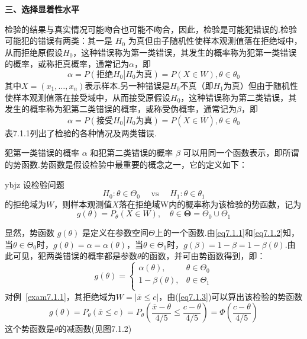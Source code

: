 \textbf{三、选择显着性水平}

检验的结果与真实情况可能吻合也可能不吻合，因此，检验是可能犯错误的.检验可能犯的错误有两类：其一是 $H_{0}$ 为真但由子随机性使样本观测值落在拒绝域中，从而拒绝原假设$H_{0}$，这种错误称为第一类错误，其发生的概率称为犯第一类错误的概率，或称拒真概率，通常记为$\alpha$，即
\begin{equation}\label{eq7.1.1}
\alpha =P\left(\textrm{拒绝}H_0\left| H_0\textrm{为真}\right.\right)=P\left(X\in W\right),\theta\in\theta_0
\end{equation}
其中$X= \left( x _ { 1 } , \dotsc , x _ { n } \right)$表示样本.另一种错误是$H_{0}$不真（即$H_{1}$为真）但由于随机性使样本观测值落在接受域中，从而接受原假设$H_{0}$，这种错误称为第二类错误，其发生的概率称为犯第二类错误的概率，或称受伪概率，通常记为$\beta$，即
\begin{equation}\label{eq7.1.2}
\alpha =P\left(\textrm{接受}H_0\left| H_0\textrm{为真}\right.\right)=P\left(X\in \overline{ W }\right),\theta\in\theta_0
\end{equation}
表7.1.1列出了检验的各种情况及两类错误.

犯第一类错误的概率 $\alpha$ 和犯第二类错误的概率 $\beta$ 可以用同一个函数表示，即所谓的势函数.势函数是假设检验中最重要的概念之一，它的定义如下：
\begin{definition}{}{ybjz}
	设检验问题
	\[H _ { 0 } : \theta \in \Theta _ { 0 } \quad \text { vs } \quad H _ { 1 } : \theta \in \theta  _ { 1 }\]
	的拒绝域为$W$，则样本观测值$X$落在拒绝域W内的概率称为该检验的势函数，记为
	\begin{equation}\label{eq7.1.3}
	g\left(\theta\right)=P_{\theta}\left(X\in  W\right),\quad\theta\in\boldsymbol{\Theta }=\Theta_0\cup\Theta_1
	\end{equation}
\end{definition}
显然，势函数 $g(\theta)$ 是定义在参数空间$\Theta$上的一个函数.由\ref{eq7.1.1}和\ref{eq7.1.2}知，当$\theta \in \Theta_{ 0 }$时，$g ( \theta ) = \alpha = \alpha ( \theta )$，当$\theta \in \Theta_{1 }$时，$g ( \beta ) = 1-\beta = 1-\beta ( \theta )$.由此可见，犯两类错误的概率都是参数$\theta$的函数，并可由势函数得到，即：
\[
g\left(\theta\right)=\left\{\begin{matrix}
\alpha\left(\theta\right),&		\theta\in\Theta_0\\
1-\beta\left(\theta\right),&		\theta\in\Theta_1\\
\end{matrix}\right. 
\]
对例~\ref{exam7.1.1}，其拒绝域为$W = | \overline{ x } \leq c |$，由(\ref{eq7.1.3})可以算出该检验的势函数
\[
g\left(\theta\right)=P_{\theta}\left(\overline{x}\leq c\right)=P_{\theta}\left(\frac{\overline{x}-\theta}{4/5}\le\frac{c-\theta}{4/5}\right)=\Phi\left(\frac{c-\theta}{4/5}\right)
\]
这个势函数是$\theta$的减函数(见图7.1.2)

